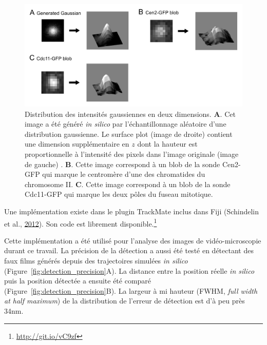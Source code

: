 \documentclass[12pt,a4paper,twoside,openright]{book}
\begin{document}
\begin{figure}[htbp]
\centering
\includegraphics{figures/results/imaging/gaussian.png}
\caption[Distribution des intensités gaussiennes en deux dimensions]{\label{fig:gaussian}Distribution
des intensités gaussiennes en deux dimensions. \textbf{A}. Cet image a
été généré \emph{in silico} par l'échantillonnage aléatoire d'une
distribution gaussienne. Le surface plot (image de droite) contient une
dimension supplémentaire en \(z\) dont la hauteur est proportionnelle à
l'intensité des pixels dans l'image originale (image de gauche) .
\textbf{B}. Cette image correspond à un blob de la sonde Cen2-GFP qui
marque le centromère d'une des chromatides du chromosome II. \textbf{C}.
Cette image correspond à un blob de la sonde Cdc11-GFP qui marque les
deux pôles du fuseau mitotique.}
\end{figure}

Une implémentation existe dans le plugin TrackMate inclus dans Fiji
(Schindelin et al., \hyperref[ref-Schindelin2012]{2012}). Son code est
librement disponible.\footnote{\url{http://git.io/vC9zf}}

Cette implémentation a été utilisé pour l'analyse des images de
vidéo-microscopie durant ce travail. La précision de la détection a
aussi été testé en détectant des faux films générés depuis des
trajectoires simulées \emph{in silico}
(Figure~\ref{fig:detection_precision}A). La distance entre la position
réelle \emph{in silico} puis la position détectée a ensuite été comparé
(Figure~\ref{fig:detection_precision}B). La largeur à mi hauteur (FWHM,
\emph{full width at half maximum}) de la distribution de l'erreur de
détection est d'à peu près 34nm.
\end{document}
